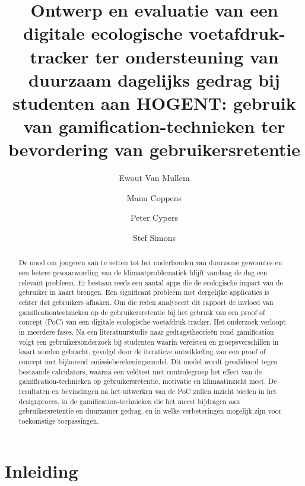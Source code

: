 \documentclass{hogent-article}
\title{Ontwerp en evaluatie van een digitale ecologische voetafdruk-tracker ter ondersteuning van duurzaam dagelijks gedrag bij studenten aan HOGENT: gebruik van gamification-technieken ter bevordering van gebruikersretentie}
\author{Ewout Van Mullem}
\author{Manu  Coppens}
\author{Peter  Cypers}
\author{Stef Simons}
\begin{document}
    
    \begin{abstract}
        

        De nood om jongeren aan te zetten tot het onderhouden van duurzame gewoontes en een betere gewaarwording van de klimaat\-problematiek blijft vandaag de dag een relevant probleem. Er bestaan reeds een aantal apps die de ecologische impact van de gebruiker in kaart brengen. Een significant probleem met dergelijke applicaties is echter dat gebruikers afhaken. Om die reden analyseert dit rapport de invloed van gamification\-technieken op de gebruikers\-retentie bij het gebruik van een proof of concept (PoC) van een digitale ecologische voetafdruk-tracker. Het onderzoek verloopt in meerdere fases. Na een literatuurstudie naar gedragstheorieën rond gamification volgt een gebruikersonderzoek bij studenten waarin vereisten en groepsverschillen in kaart worden gebracht, gevolgd door de iteratieve ontwikkeling van een proof of concept met bijhorend emissieberekeningsmodel. Dit model wordt gevalideerd tegen bestaande calculators, waarna een veldtest met controlegroep het effect van de gamification-technieken op gebruikersretentie, motivatie en klimaatinzicht meet. De resultaten en bevindingen na het uitwerken van de PoC zullen inzicht bieden in het designproces, in de gamification-technieken die het meest bijdragen aan gebruikersretentie en duurzamer gedrag, en in welke verbeteringen mogelijk zijn voor toekomstige toepassingen. %
        
    \end{abstract}
    
    \tableofcontents
    
    \section{Inleiding}%
    \label{sec:inleiding}
    

    
\end{document}

